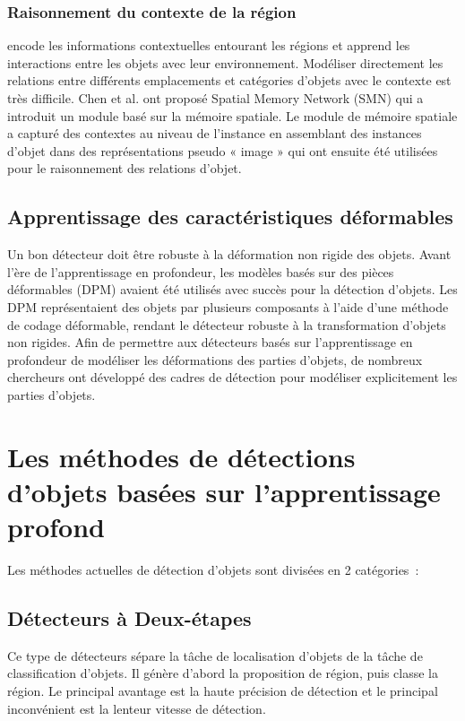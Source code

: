      \subsubsection{Raisonnement du contexte de la région} encode les informations contextuelles entourant les régions et apprend les interactions entre les objets avec leur environnement. Modéliser directement les relations entre différents emplacements et catégories d'objets avec le contexte est très difficile. Chen et al. ont proposé Spatial Memory Network (SMN) \cite{smn_paper} qui a introduit un module basé sur la mémoire spatiale. Le module de mémoire spatiale a capturé des contextes au niveau de l'instance en assemblant des instances d'objet dans des représentations pseudo « image » qui ont ensuite été utilisées pour le raisonnement des relations d'objet.

     \subsection{Apprentissage des caractéristiques déformables}
     Un bon détecteur doit être robuste à la déformation non rigide des objets. Avant l'ère de l'apprentissage en profondeur, les modèles basés sur des pièces déformables (DPM) \cite{dpm_paper} avaient été utilisés avec succès pour la détection d'objets. Les DPM représentaient des objets par plusieurs composants à l'aide d'une méthode de codage déformable, rendant le détecteur robuste à la transformation d'objets non rigides. Afin de permettre aux détecteurs basés sur l'apprentissage en profondeur de modéliser les déformations des parties d'objets, de nombreux chercheurs ont développé des cadres de détection pour modéliser explicitement les parties d'objets.


\section{Les méthodes de détections d'objets basées sur l'apprentissage profond} 
Les méthodes actuelles de détection d'objets sont divisées en 2 catégories :
     \subsection{Détecteurs à Deux-étapes}
     Ce type de détecteurs sépare la tâche de localisation d'objets de la tâche de classification d'objets. Il génère d'abord la proposition de région, puis classe la région. Le principal avantage est la haute précision de détection et le principal inconvénient est la lenteur vitesse de détection.
     
